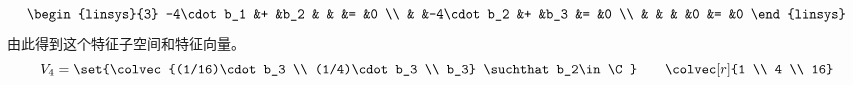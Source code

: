 \begin{exercises}
\begin{answer}
\begin{exparts}
\begin{align*}
\begin{linsys}{3}
               -4\cdot b_1  &+  &b_2          &   &           &= &0  \\
                            &   &-4\cdot b_2  &+  &b_3        &= &0  \\
                            &   &              &  &0          &= &0 
             \end{linsys}
           \end{align*}
           由此得到这个特征子空间和特征向量。
           \begin{equation*}
             V_4=\set{\colvec{(1/16)\cdot b_3 \\ (1/4)\cdot b_3 \\ b_3}
                   \suchthat b_2\in\C}
             \qquad
             \colvec[r]{1 \\ 4 \\ 16}
           \end{equation*}


\end{exparts}
\end{answer}
\end{exercises}
